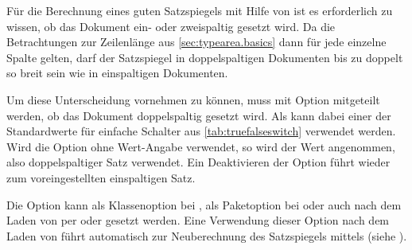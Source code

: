 \begin{Declaration}
\end{Declaration}%
Für die Berechnung eines guten Satzspiegels mit Hilfe von
 ist es erforderlich zu wissen, ob das
Dokument ein- oder zweispaltig gesetzt wird. Da die Betrachtungen zur
Zeilenlänge aus \autoref{sec:typearea.basics} dann für jede einzelne Spalte
gelten, darf der Satzspiegel in doppelspaltigen Dokumenten bis zu doppelt so
breit sein wie in einspaltigen Dokumenten.

Um diese Unterscheidung vornehmen zu können, muss  mit
Option  mitgeteilt werden, ob das Dokument doppelspaltig
gesetzt wird. Als  kann dabei einer der Standardwerte für
einfache Schalter aus \autoref{tab:truefalseswitch} verwendet werden. Wird die
Option ohne Wert-Angabe verwendet, so wird der Wert
 angenommen, also
doppelspaltiger Satz verwendet. Ein
Deaktivieren der Option führt wieder zum voreingestellten
einspaltigen Satz.

Die Option kann als Klassenoption bei ,
als Paketoption bei  oder auch nach dem
Laden von  per  oder
 gesetzt werden. Eine Verwendung dieser
Option nach dem Laden von  führt automatisch zur Neuberechnung des Satzspiegels mittels
 (siehe
).%
%
\EndIndexGroup


